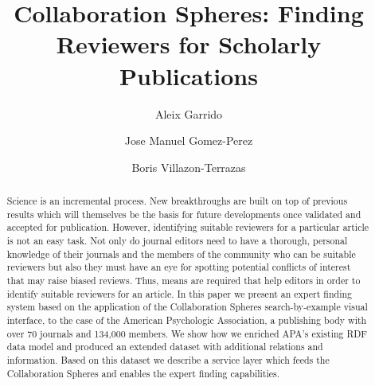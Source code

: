 \documentclass{llncs}
\begin{document}
%
\frontmatter          %
%
\pagestyle{headings}  %
%
%
\mainmatter              %
%
\title{Collaboration Spheres: Finding Reviewers for Scholarly Publications}

%
%
\author{Aleix Garrido \and Jose Manuel Gomez-Perez \and Boris Villazon-Terrazas}
%
%
%


\maketitle              %



\begin{abstract}
Science is an incremental process. New breakthroughs are built on top of previous results which will themselves be the basis for future developments once validated and accepted for publication. However, identifying suitable reviewers for a particular article is not an easy task. Not only do journal editors need to have a thorough, personal knowledge of their journals and the members of the community who can be suitable reviewers but also they must have an eye for spotting potential conflicts of interest that may raise biased reviews. Thus, means are required that help editors in order to identify suitable reviewers for an article. In this paper we present an expert finding system based on the application of the Collaboration Spheres search-by-example visual interface, to the case of the American Psychologic Association, a publishing body with over 70 journals and 134,000 members. We show how we enriched APA's existing RDF data model and produced an extended dataset with additional relations and information. Based on this dataset we describe a service layer which feeds the Collaboration Spheres and enables the expert finding capabilities. 
\end{abstract}
\end{document}
